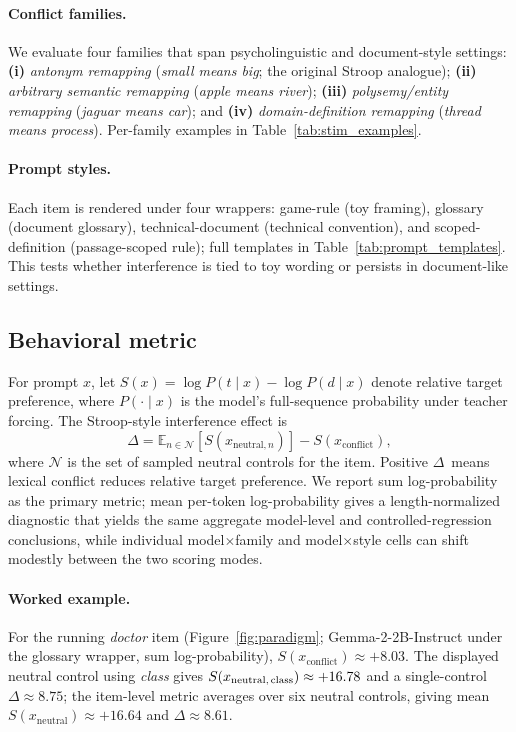 \documentclass[11pt]{article}
\newcommand{\effect}{\ensuremath{\Delta}\xspace}
\begin{document}
\paragraph{Conflict families.}
We evaluate four families that span psycholinguistic and document-style settings:
\textbf{(i)} \emph{antonym remapping} (\emph{small means big}; the original Stroop analogue);
\textbf{(ii)} \emph{arbitrary semantic remapping} (\emph{apple means river}); \textbf{(iii)}
\emph{polysemy/entity remapping} (\emph{jaguar means car}); and \textbf{(iv)}
\emph{domain-definition remapping} (\emph{thread means process}). Per-family examples in
Table~\ref{tab:stim_examples}.

\paragraph{Prompt styles.}
Each item is rendered under four wrappers: game-rule (toy framing), glossary (document
glossary), technical-document (technical convention), and scoped-definition (passage-scoped
rule); full templates in Table~\ref{tab:prompt_templates}. This tests whether interference is
tied to toy wording or persists in document-like settings.

\subsection{Behavioral metric}

For prompt $x$, let $S(x) = \log P(t \mid x) - \log P(d \mid x)$ denote relative target preference,
where $P(\cdot \mid x)$ is the model's full-sequence probability under teacher forcing.
The Stroop-style interference effect is
\[
\effect = \mathbb{E}_{n \in \mathcal{N}}\!\left[ S(x_{\text{neutral},n}) \right] - S(x_{\text{conflict}}),
\]
where $\mathcal{N}$ is the set of sampled neutral controls for the item.
Positive \effect~means lexical conflict reduces relative target preference.
We report sum log-probability as the primary metric; mean per-token log-probability gives a
length-normalized diagnostic that yields the same aggregate model-level and controlled-regression
conclusions, while individual model$\times$family and model$\times$style cells can shift modestly
between the two scoring modes.

\paragraph{Worked example.}
For the running \emph{doctor} item (Figure~\ref{fig:paradigm}; Gemma-2-2B-Instruct under the
glossary wrapper, sum log-probability), $S(x_{\text{conflict}}) \approx {+}8.03$. The displayed
neutral control using \emph{class} gives $S(x_{\text{neutral,\,class}}) \approx {+}16.78$ and
a single-control $\effect \approx 8.75$; the item-level metric averages over six neutral
controls, giving mean $S(x_{\text{neutral}}) \approx {+}16.64$ and $\effect \approx 8.61$.
\end{document}
